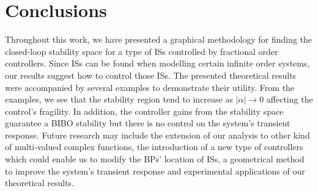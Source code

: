 \documentclass[twoside,reqno,11pt]{fcaa-var} %
\begin{document}
\section{Conclusions}
Throughout this work, we have presented a graphical methodology for finding the closed-loop stability space for a type of ISs controlled by fractional order controllers. Since ISs can be found when modelling certain infinite order systems, our results suggest how to control those ISs. The presented theoretical results were accompanied by several examples to demonstrate their utility. From the examples, we see that the stability region tend to increase as $\vert\alpha\vert\rightarrow 0$ affecting the control's fragility. In addition, the controller gains  from the stability space guarantee a BIBO stability but there is no control on the system's transient response. Future research may include the extension of our analysis to other kind of multi-valued complex functions, the introduction of a new type of controllers which could enable us to modify the BPs' location of ISs, a geometrical method to improve the system's transient response and experimental applications of our theoretical results. 





 \bigskip \smallskip

 \it
\end{document}
